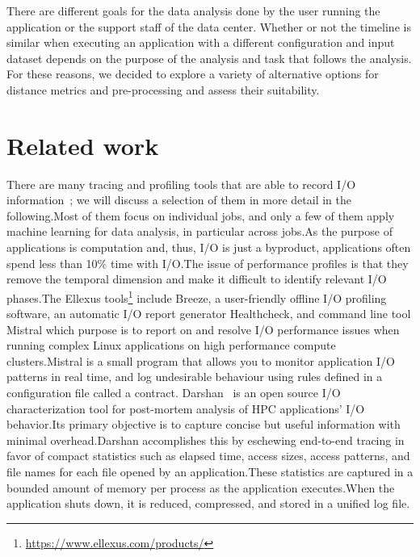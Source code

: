 \documentclass[]{llncs}
\begin{document}
There are different goals for the data analysis done by the user running the application or the support staff of the data center.
Whether or not the timeline is similar when executing an application with a different configuration and input dataset depends on the purpose of the analysis and task that follows the analysis.
For these reasons, we decided to explore a variety of alternative options for distance metrics and pre-processing and assess their suitability.


\section{Related work}
There are many tracing and profiling tools that are able to record I/O information~\cite{TFAPIKBBCF19}; we will discuss a selection of them in more detail in the following.Most of them focus on individual jobs, and only a few of them apply machine learning for data analysis, in particular across jobs.As the purpose of applications is computation and, thus, I/O is just a byproduct, applications often spend less than 10\% time with I/O.The issue of performance profiles is that they remove the temporal dimension and make it difficult to identify relevant I/O phases.The Ellexus tools\footnote{\url{https://www.ellexus.com/products/}} include Breeze, a user-friendly offline I/O profiling software, an automatic I/O report generator Healthcheck, and command line tool Mistral which purpose is to report on and resolve I/O performance issues when running complex Linux applications on high performance compute clusters.Mistral is a small program that allows you to monitor application I/O patterns in real time, and log undesirable behaviour using rules defined in a configuration file called a contract.
Darshan~\cite{carns2011understanding-toc,hpcdarshan} is an open source I/O characterization tool for post-mortem analysis of HPC applications' I/O behavior.Its primary objective is to capture concise but useful information with minimal overhead.Darshan accomplishes this by eschewing end-to-end tracing in favor of compact statistics such as elapsed time, access sizes, access patterns, and file names for each file opened by an application.These statistics are captured in a bounded amount of memory per process as the application executes.When the application shuts down, it is reduced, compressed, and stored in a unified log file.%
\end{document}
